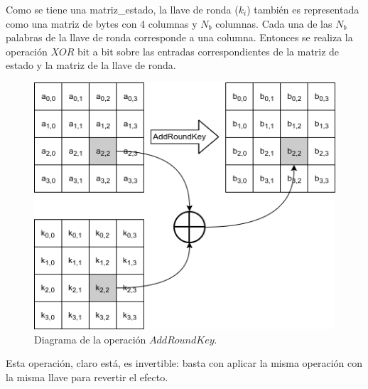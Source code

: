 Como se tiene una matriz\_estado, la llave de ronda ($k_i$) también
es representada como una matriz de bytes con 4 columnas y $N_b$ columnas.
Cada una de las $N_b$ palabras de la llave de ronda corresponde a una
columna. Entonces se realiza la operación $XOR$ bit a bit sobre las
entradas correspondientes de la matriz de estado y la matriz de la llave
de ronda.

\begin{figure}[H]
  \begin{center}
    \includegraphics[width=0.6\linewidth]{diagramas/addRoundKey}
    \caption{Diagrama de la operación $AddRoundKey$.}
   \end{center}
\end{figure}

Esta operación, claro está, es invertible: basta con aplicar la misma
operación con la misma llave para revertir el efecto.
